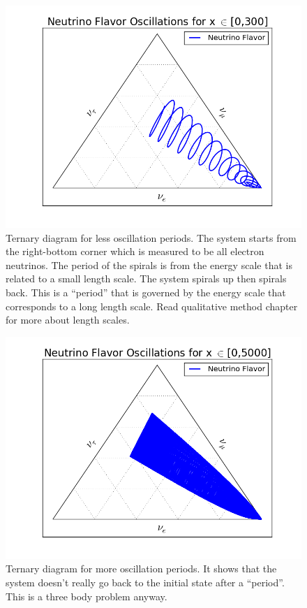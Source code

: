 \documentclass[letterpaper,12pt,english]{sphinxmanual}
\begin{document}
\begin{figure}[htbp]
\centering
\capstart

\includegraphics{vacOsc3FlavorTernary300.png}
\caption{Ternary diagram for less oscillation periods. The system starts from the right-bottom corner which is measured to be all electron neutrinos. The period of the spirals is from the energy scale that is related to a small length scale. The system spirals up then spirals back. This is a ``period'' that is governed by the energy scale that corresponds to a long length scale. Read qualitative method chapter for more about length scales.}\end{figure}
\begin{figure}[htbp]
\centering
\capstart

\includegraphics{vacOsc3FlavorTernary5000.png}
\caption{Ternary diagram for more oscillation periods. It shows that the system doesn't really go back to the initial state after a ``period''. This is a three body problem anyway.}\end{figure}
\end{document}
